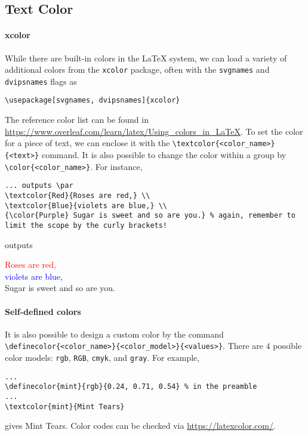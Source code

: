 \subsection{Text Color}

\paragraph{xcolor}
While there are built-in colors in the \LaTeX{} system, we can load a variety of additional colors from the \verb|xcolor| package, often with the \verb|svgnames| and \verb|dvipsnames| flags as
\begin{lstlisting}
\usepackage[svgnames, dvipsnames]{xcolor}    
\end{lstlisting}
The reference color list can be found in \href{https://www.overleaf.com/learn/latex/Using_colors_in_LaTeX}{https://www.overleaf.com/learn/latex/\allowbreak Using\_colors\_in\_LaTeX}. To set the color for a piece of text, we can enclose it with the \texttt{\textbackslash textcolor\{<color\_name>\}\{<text>\}} command. It is also possible to change the color within a group by \texttt{\textbackslash color\{<color\_name>\}}. For instance,
\begin{lstlisting}
... outputs \par
\textcolor{Red}{Roses are red,} \\
\textcolor{Blue}{violets are blue,} \\ 
{\color{Purple} Sugar is sweet and so are you.} % again, remember to limit the scope by the curly brackets!
\end{lstlisting}
outputs \par
\textcolor{Red}{Roses are red,} \\
\textcolor{Blue}{violets are blue,} \\ 
{\color{Purple} Sugar is sweet and so are you.}

\paragraph{Self-defined colors}
It is also possible to design a custom color by the command \texttt{\textbackslash definecolor\{<color\_name>\}\{<color\_model>\}\{<values>\}}. There are $4$ possible color models: \verb|rgb|, \verb|RGB|, \verb|cmyk|, and \verb|gray|. For example,
\begin{lstlisting}
...
\definecolor{mint}{rgb}{0.24, 0.71, 0.54} % in the preamble
...
\textcolor{mint}{Mint Tears}
\end{lstlisting}
gives \textcolor{mint}{Mint Tears}. Color codes can be checked via \href{https://latexcolor.com/}{https://latexcolor.com/}.\par

